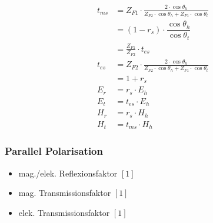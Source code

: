 \begin{align*}
    t_{m s}                           & = Z_{F 1} \cdot \frac{2 \cdot \cos \theta_h}{Z_{F 2} \cdot \cos \theta_h+Z_{F 1} \cdot \cos \theta_t}                                                           \\
                                      & = (1 - r_{s}) \cdot \dfrac{\cos \theta_h}{\cos \theta_t}                                                                                                        \\
                                      & = \frac{Z_{F1}}{Z_{F2}}\cdot t_{es}                                                                                                                             \\
    t_{e s}                           & = Z_{F 2} \cdot \frac{2 \cdot \cos \theta_h}{Z_{F 2} \cdot \cos \theta_h+Z_{F 1} \cdot \cos \theta_t}                                                           \\
                                      & = 1+r_{s}                                                                                                                                                       \\
    E_{r}                             & = r_{s} \cdot E_{h}                                                                                                                                             \\
    E_{t}                             & = t_{e s} \cdot E_{h}                                                                                                                                           \\
    H_{r}                             & = r_{s} \cdot H_{h}                                                                                                                                             \\
    H_{t}                             & = t_{m s} \cdot H_{h}
\end{align*}

\subsubsection{Parallel Polarisation}


\begin{itemize}
    \item mag./elek. Reflexionsfaktor $[1]$
    \item mag. Transmissionsfaktor $[1]$
    \item elek. Transmissionsfaktor $[1]$
\end{itemize}

